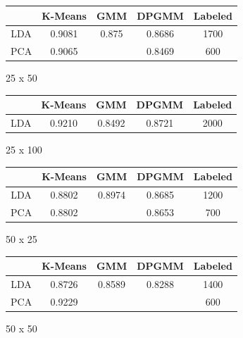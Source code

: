 \documentclass[11pt,a4paper]{article}
\begin{document}
	
	
	\begin{figure}
	\begin{center}
	\begin{tabular}{|c|c|c|c|c|}
		\hline
		 & K-Means & GMM & DPGMM & Labeled \\
		 \hline
		 LDA & 0.9081 & 0.875 & 0.8686 & 1700 \\
		 \hline
		 PCA & 0.9065 & & 0.8469 & 600 \\
		 \hline
	\end{tabular}
	\caption{25 x 50}
	\end{center}
	\end{figure}
	
	
	
	\begin{figure}
	\begin{center}
	\begin{tabular}{|c|c|c|c|c|}
		\hline
		 & K-Means & GMM & DPGMM & Labeled \\
		 \hline
		 LDA & 0.9210 & 0.8492 & 0.8721 & 2000 \\
		 \hline
	\end{tabular}
	\caption{25 x 100}
	\end{center}
	\end{figure}
	
	
	
	\begin{figure}
	\begin{center}
	\begin{tabular}{|c|c|c|c|c|}
		\hline
		 & K-Means & GMM & DPGMM & Labeled \\
		 \hline
		 LDA & 0.8802 & 0.8974 & 0.8685 & 1200 \\
		 \hline
		 PCA & 0.8802 & & 0.8653 & 700 \\
		 \hline
	\end{tabular}
	\caption{50 x 25}
	\end{center}
	\end{figure}
	
	
	
	\begin{figure}
	\begin{center}
	\begin{tabular}{|c|c|c|c|c|}
		\hline
		 & K-Means & GMM & DPGMM & Labeled\\
		 \hline
		 LDA & 0.8726 & 0.8589 & 0.8288  & 1400 \\
		 \hline
		 PCA & 0.9229 & & & 600 \\
		 \hline
	\end{tabular}
	\caption{50 x 50}
	\end{center}
	\end{figure}
	
\end{document}
